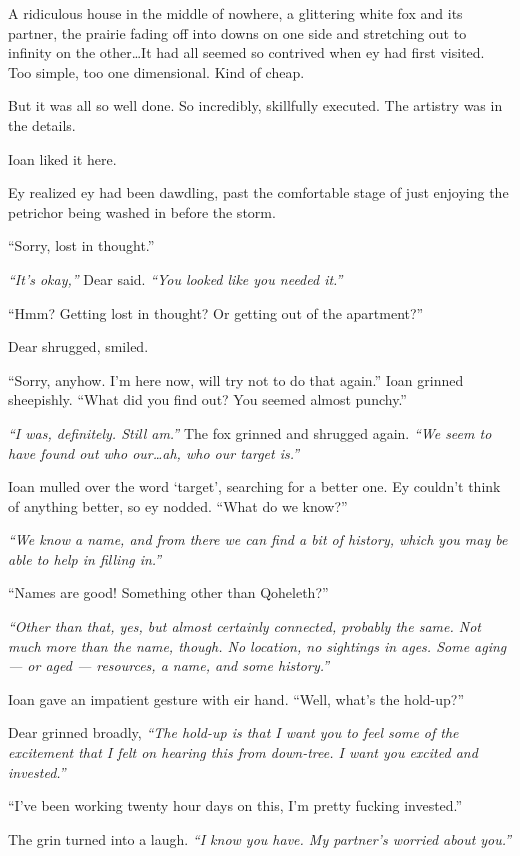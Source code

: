 A ridiculous house in the middle of nowhere, a glittering white fox and its partner, the prairie fading off into downs on one side and stretching out to infinity on the other\ldots{}It had all seemed so contrived when ey had first visited. Too simple, too one dimensional. Kind of cheap.

But it was all so well done. So incredibly, skillfully executed. The artistry was in the details.

Ioan liked it here.

Ey realized ey had been dawdling, past the comfortable stage of just enjoying the petrichor being washed in before the storm.

``Sorry, lost in thought.''

\emph{``It's okay,''} Dear said. \emph{``You looked like you needed it.''}

``Hmm? Getting lost in thought? Or getting out of the apartment?''

Dear shrugged, smiled.

``Sorry, anyhow. I'm here now, will try not to do that again.'' Ioan grinned sheepishly. ``What did you find out? You seemed almost punchy.''

\emph{``I was, definitely. Still am.''} The fox grinned and shrugged again. \emph{``We seem to have found out who our\ldots{}ah, who our target is.''}

Ioan mulled over the word `target', searching for a better one. Ey couldn't think of anything better, so ey nodded. ``What do we know?''

\emph{``We know a name, and from there we can find a bit of history, which you may be able to help in filling in.''}

``Names are good! Something other than Qoheleth?''

\emph{``Other than that, yes, but almost certainly connected, probably the same. Not much more than the name, though. No location, no sightings in ages. Some aging --- or aged --- resources, a name, and some history.''}

Ioan gave an impatient gesture with eir hand. ``Well, what's the hold-up?''

Dear grinned broadly, \emph{``The hold-up is that I want you to feel some of the excitement that I felt on hearing this from down-tree. I want you excited and invested.''}

``I've been working twenty hour days on this, I'm pretty fucking invested.''

The grin turned into a laugh. \emph{``I know you have. My partner's worried about you.''}

